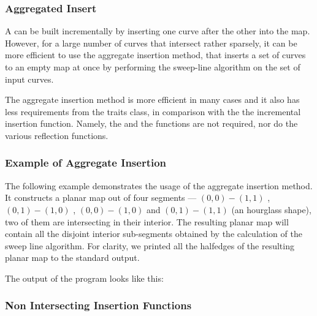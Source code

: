 \subsubsection{Aggregated Insert}

A  can be built incrementally by
inserting one curve after the other into the map. However, for a large number
of curves that intersect rather sparsely, it can be more efficient to use the
aggregate insertion method, that inserts a set of curves to an empty map at
once by performing the sweep-line algorithm on the set of input curves.

The aggregate insertion method is more efficient in many cases and it also
has less requirements from the traits class, in comparison with the the
incremental insertion function. Namely, the  and the  functions are not required, nor do
the various reflection functions.

\subsubsection{Example of Aggregate Insertion}
\label{sssec:example1_aggrinsrt}
The following example demonstrates the usage of the aggregate insertion
method. It constructs a planar map out of four segments --- 
$(0,0)-(1,1)$ , $(0,1)-(1,0)$ , $(0,0)-(1,0)$ and $(0,1)-(1,1)$
(an hourglass shape), two of them are intersecting in their interior. 
The resulting planar map will contain all the disjoint interior sub-segments 
obtained by the calculation of the sweep line algorithm. For clarity, we printed all the halfedges of the resulting planar map to the standard output.


The output of the program looks like this:


\subsubsection{Non Intersecting Insertion Functions}

